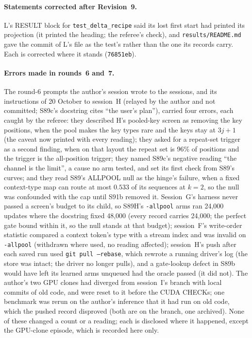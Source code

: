\documentclass[11pt]{article}
\begin{document}
\paragraph{Statements corrected after Revision~9.} L's RESULT block for \texttt{test\_delta\_recipe} said its lost first start had printed its projection (it printed the heading; the referee's check), and \texttt{results/README.md} gave the commit of L's file as the test's rather than the one its records carry. Each is corrected where it stands (\texttt{76851eb}).

\paragraph{Errors made in rounds~6 and~7.} The round-6 prompts the author's session wrote to the sessions, and its instructions of 20 October to session~H (relayed by the author and not committed; S89c's docstring cites ``the user's plan''), carried four errors, each caught by the referee: they described H's pooled-key screen as removing the key positions, when the pool makes the key types rare and the keys stay at $3j + 1$ (the caveat now printed with every reading); they asked for a repeat-set trigger as a second finding, when on that layout the repeat set is 96\% of positions and the trigger is the all-position trigger; they named S89c's negative reading ``the channel is the limit'', a cause no arm tested, and set its first check from S89's curves; and they read S89's ALLPOOL null as the hinge's failure, when a fixed context-type map can route at most $0.533$ of its sequences at $k = 2$, so the null was confounded with the cap until S91b removed it. Session~G's harness never passed a screen's budget to its child, so S89H's \texttt{-allpool} arms ran 24{,}000 updates where the docstring fixed 48{,}000 (every record carries 24{,}000; the perfect gate bound within it, so the null stands at that budget); session~F's write-order statistic compared a context token's type with a stream index and was invalid on \texttt{-allpool} (withdrawn where used, no reading affected); session~H's push after each saved run used \texttt{git pull --rebase}, which rewrote a running driver's log (the store was intact; the driver no longer pulls), and a gate-lookup defect in S89b would have left its learned arms unqueued had the oracle passed (it did not). The author's two GPU clones had diverged from session~I's branch with local commits of old code, and were reset to it before the CUDA CHECKs; one benchmark was rerun on the author's inference that it had run on old code, which the pushed record disproved (both are on the branch, one archived). None of these changed a count or a reading; each is disclosed where it happened, except the GPU-clone episode, which is recorded here only.
\end{document}
